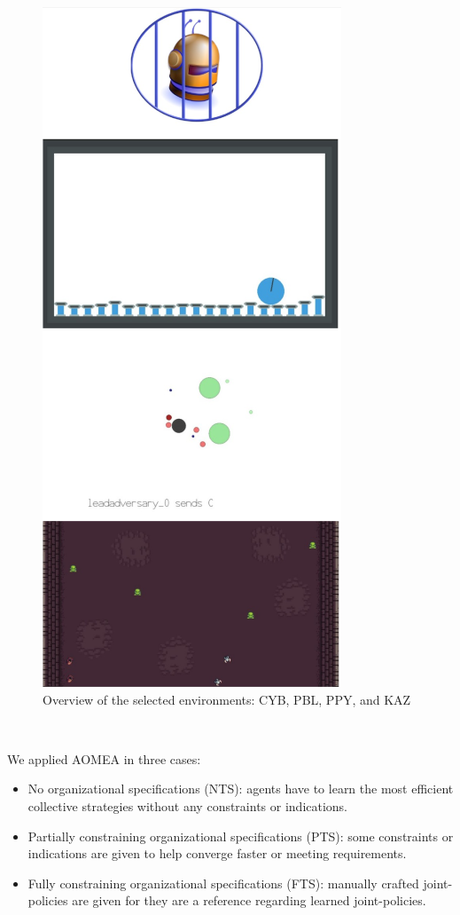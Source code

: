 \documentclass[runningheads]{llncs}
\begin{document}
\begin{minipage}[t]{0.37\textwidth}
    \vspace{-1.7cm}
    \begin{figure}[H] %
        \centering
        \includegraphics[width=0.6\linewidth]{figures/envs.png} %
        \caption{Overview of the selected environments: CYB, PBL, PPY, and KAZ}
        \label{fig:simulated_environments}
    \end{figure}
\end{minipage}

\

\noindent We applied AOMEA in three cases:
\begin{itemize}
    \item No organizational specifications (NTS): agents have to learn the most efficient collective strategies without any constraints or indications.
    \item Partially constraining organizational specifications (PTS): some constraints or indications are given to help converge faster or meeting requirements.
    \item Fully constraining organizational specifications (FTS): manually crafted joint-policies are given for they are a reference regarding learned joint-policies.
\end{itemize}
\end{document}
